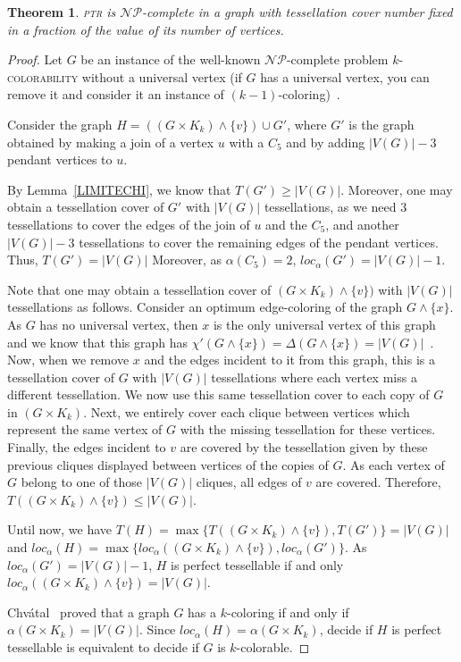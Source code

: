\documentclass[9pt]{entcs} \usepackage{entcsmacro}
\newtheorem{teo}{Theorem}[section]
\begin{document}
\begin{teo}
\textsc{ptr} is $\mathcal{NP}$-complete in a graph with tessellation cover number fixed in a fraction of the value of its number of vertices.
\label{teo:npcTGfixed}
\end{teo}
\begin{proof}

Let $G$ be an instance of the well-known $\mathcal{NP}$-complete problem \textsc{$k$-colorability} without a universal vertex (if $G$ has a universal vertex, you can remove it and consider it an instance of $(k-1)$-coloring)~\cite{ArGarey}.

Consider the graph $H=((G \times K_k) \land \{v\}) \cup G'$, where $G'$ is the graph obtained by making a join of a vertex $u$ with a $C_5$ and by adding $|V(G)|-3$ pendant vertices to $u$.

By Lemma~\ref{LIMITECHI}, we know that $T(G') \geq |V(G)|$.
Moreover, one may obtain a tessellation cover of $G'$ with $|V(G)|$ tessellations, as we need 3 tessellations to cover the edges of the join of $u$ and the $C_5$, and another $|V(G)|-3$ tessellations to cover the remaining edges of the pendant vertices.
Thus, $T(G') = |V(G)|$
Moreover,  as $\alpha(C_5)=2$, $loc_\alpha(G') = |V(G)|-1$.

Note that one may obtain a tessellation cover of $(G \times K_k) \land \{v\})$ with $|V(G)|$ tessellations as follows.
Consider an optimum edge-coloring of the graph $G \land \{x\}$.
As $G$ has no universal vertex, then $x$ is the only universal vertex of this graph and we know that this graph has $\chi'(G \land \{x\}) = \Delta(G \land \{x\}) = |V(G)|$~\cite{ArClasse1}.
Now, when we remove $x$ and the edges incident to it from this graph, this is a tessellation cover of $G$ with $|V(G)|$ tessellations where each vertex miss a different tessellation.
We now use this same tessellation cover to each copy of $G$ in $(G \times K_k)$.
Next, we entirely cover each clique between vertices which represent the same vertex of $G$ with the missing tessellation for these vertices.
Finally, the edges incident to $v$ are covered by the tessellation given by these previous cliques displayed between vertices of the copies of $G$. As each vertex of $G$ belong to one of those $|V(G)|$ cliques, all edges of $v$ are covered.
Therefore, $T((G \times K_k) \land \{v\}) \leq |V(G)|$.

Until now, we have $T(H) = \max\{T((G \times K_k) \land \{v\}), T(G')\} = |V(G)|$ and $loc_\alpha(H) = \max\{loc_\alpha((G \times K_k) \land \{v\}), loc_\alpha(G')\}$.
As $loc_\alpha(G') = |V(G)|-1$, $H$ is perfect tessellable if and only $loc_\alpha((G \times K_k) \land \{v\}) = |V(G)|$.

Chv\'atal~\cite{ArChvtal} proved that a graph $G$ has a $k$-coloring if and only if $\alpha(G \times K_k) = |V(G)|$.
Since $loc_\alpha(H) = \alpha(G \times K_k)$, decide if $H$ is perfect tessellable is equivalent to decide if $G$ is $k$-colorable.
\end{proof}
\end{document}
